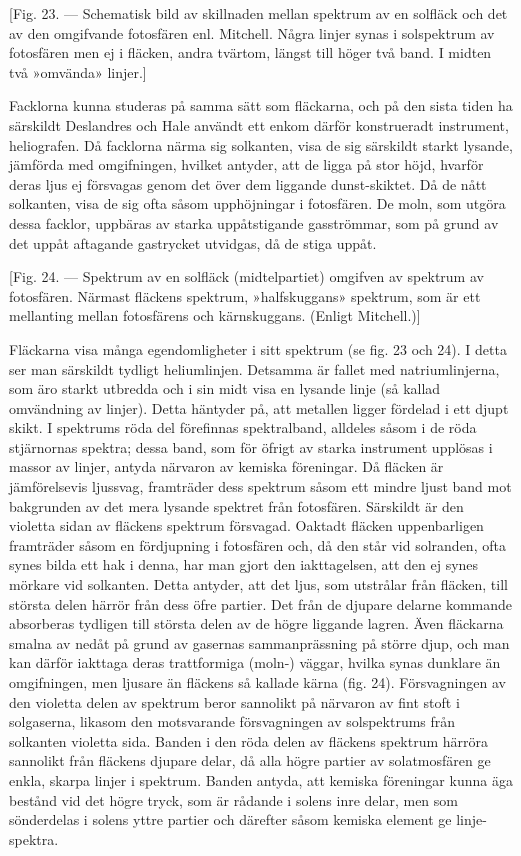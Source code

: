 \documentclass[a4paper, 12pt, oneside, swedish]{article}
\begin{document}
[Fig. 23. --- Schematisk bild av skillnaden mellan spektrum av en solfläck och det av den omgifvande fotosfären enl. Mitchell. Några linjer synas i solspektrum av fotosfären men ej i fläcken, andra tvärtom, längst till höger två band. I midten två »omvända» linjer.]

Facklorna kunna studeras på samma sätt som fläckarna, och på den sista tiden ha särskildt Deslandres och Hale användt ett enkom därför konstrueradt instrument, heliografen. Då facklorna närma sig solkanten, visa de sig särskildt starkt lysande, jämförda med omgifningen, hvilket antyder, att de ligga på stor höjd, hvarför deras ljus ej försvagas genom det över dem liggande dunst-skiktet. Då de nått solkanten, visa de sig ofta såsom upphöjningar i fotosfären. De moln, som utgöra dessa facklor, uppbäras av starka uppåtstigande gasströmmar, som på grund av det uppåt aftagande gastrycket utvidgas, då de stiga uppåt.

[Fig. 24. --- Spektrum av en solfläck (midtelpartiet) omgifven av spektrum av fotosfären. Närmast fläckens spektrum, »halfskuggans» spektrum, som är ett mellanting mellan fotosfärens och kärnskuggans. (Enligt Mitchell.)]

Fläckarna visa många egendomligheter i sitt spektrum (se fig. 23 och 24). I detta ser man särskildt tydligt heliumlinjen. Detsamma är fallet med natriumlinjerna, som äro starkt utbredda och i sin midt visa en lysande linje (så kallad omvändning av linjer). Detta häntyder på, att metallen ligger fördelad i ett djupt skikt. I spektrums röda del förefinnas spektralband, alldeles såsom i de röda stjärnornas spektra; dessa band, som för öfrigt av starka instrument upplösas i massor av linjer, antyda närvaron av kemiska föreningar. Då fläcken är jämförelsevis ljussvag, framträder dess spektrum såsom ett mindre ljust band mot bakgrunden av det mera lysande spektret från fotosfären. Särskildt är den violetta sidan av fläckens spektrum försvagad. Oaktadt fläcken uppenbarligen framträder såsom en fördjupning i fotosfären och, då den står vid solranden, ofta synes bilda ett hak i denna, har man gjort den iakttagelsen, att den ej synes mörkare vid solkanten. Detta antyder, att det ljus, som utstrålar från fläcken, till största delen härrör från dess öfre partier. Det från de djupare delarne kommande absorberas tydligen till största delen av de högre liggande lagren. Även fläckarna smalna av nedåt på grund av gasernas sammanprässning på större djup, och man kan därför iakttaga deras trattformiga (moln-) väggar, hvilka synas dunklare än omgifningen, men ljusare än fläckens så kallade kärna (fig. 24). Försvagningen av den violetta delen av spektrum beror sannolikt på närvaron av fint stoft i solgaserna, likasom den motsvarande försvagningen av solspektrums från solkanten violetta sida. Banden i den röda delen av fläckens spektrum härröra sannolikt från fläckens djupare delar, då alla högre partier av solatmosfären ge enkla, skarpa linjer i spektrum. Banden antyda, att kemiska föreningar kunna äga bestånd vid det högre tryck, som är rådande i solens inre delar, men som sönderdelas i solens yttre partier och därefter såsom kemiska element ge linje-spektra.
\end{document}
